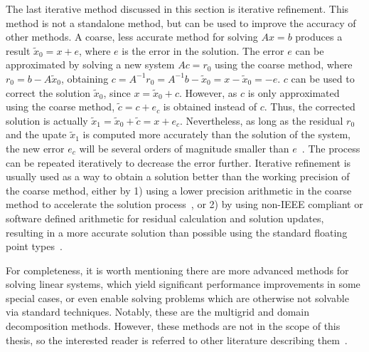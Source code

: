 The last iterative method discussed in this section is iterative refinement.
This method is not a standalone method, but can be used to improve the accuracy
of other methods. A coarse, less accurate method for solving $Ax = b$ produces a
result $\tilde{x}_0 = x + e$, where $e$ is the error in the solution.  The error
$e$ can be approximated by solving a new system $Ac = r_0$ using the coarse
method, where $r_0 = b - A\tilde{x}_0$, obtaining $c = A^{-1}r_0 = A^{-1}b -
\tilde{x}_0 = x - \tilde{x}_0 = -e$.  $c$ can be used to correct the solution
$\tilde{x}_0$, since $x = \tilde{x}_0 + c$. However, as $c$ is only approximated
using the coarse method, $\tilde{c} = c + e_c$ is obtained instead of $c$. Thus,
the corrected solution is actually $\tilde{x}_1 = \tilde{x}_0 + \tilde{c} = x +
e_c$. Nevertheless, as long as the residual $r_0$ and the upate $\tilde{x}_1$ is
computed more accurately than the solution of the system, the new error $e_c$
will be several orders of magnitude smaller than $e$~\cite{demmel,saad}. The
process can be repeated iteratively to decrease the error further. Iterative
refinement is usually used as a way to obtain a solution
better than the working precision of the coarse method, either by 1) using a
lower precision arithmetic in the coarse method to accelerate the solution
process~\cite{higham-ir,anzt-ir}, or 2) by using non-IEEE compliant or software
defined arithmetic for residual calculation and solution updates, resulting in a
more accurate solution than possible using the standard floating point
types~\cite{demmel}.

For completeness, it is worth mentioning there are more advanced methods for
solving linear systems, which yield significant performance improvements in some
special cases, or even enable solving problems which are otherwise not solvable
via standard techniques. Notably, these are the multigrid and domain
decomposition methods. However, these methods are not in the scope of this
thesis, so the interested reader is referred to other literature describing
them~\cite{demmel,saad}.
